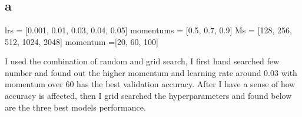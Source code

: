 \newpage
\section{}

\subsection{a}

lrs = [0.001, 0.01, 0.03, 0.04, 0.05]
momentums = [0.5, 0.7, 0.9]
Ms = [128, 256, 512, 1024, 2048]
momentum =[20, 60, 100]

I used the combination of random and grid search, I first hand searched
few number and found out the higher momentum and learning rate around 
0.03 with momentum over 60 has the best validation accuracy. After I have a sense of 
how accuracy is affected, then I grid searched the hyperparameters and found
below are the three best models performance.

